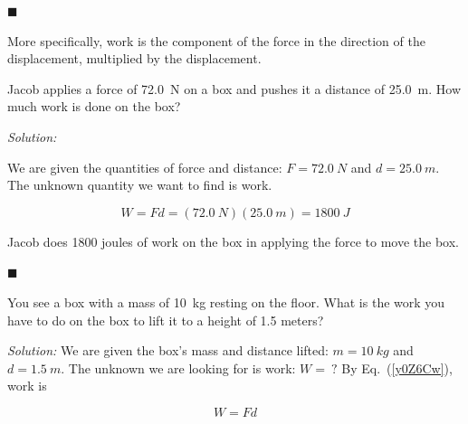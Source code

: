 \documentclass[dvipsnames]{article}
\begin{document}

\hfill $\blacksquare$

More specifically, work is the component of the force in the direction of the displacement, multiplied by the displacement.


\begin{example} \label{HKavsZ}
Jacob applies a force of \SI{72.0}{N} on a box and pushes it a distance of \SI{25.0}{m}. How much work is done on the box?
\end{example} 

\begin{center}
\end{center}

\textit{Solution:} 

We are given the quantities of force and distance: $F = \SI{72.0}{N}$ and $d = \SI{25.0}{m}$. The unknown quantity we want to find is work.

\begin{equation*}
    W = F d = \left(\SI{72.0}{N}\right)\left(\SI{25.0}{m}\right) = \SI{1800}{J}
\end{equation*}

Jacob does 1800 joules of work on the box in applying the force to move the box.

\hfill $\blacksquare$


\begin{example}\label{O9RxyJ}
You see a box with a mass of \SI{10}{kg} resting on the floor. What is the work you have to do on the box to lift it to a height of 1.5 meters? 
\end{example} 
 

\textit{Solution:} 
We are given the box's mass and distance lifted: $m = \SI{10}{kg}$ and $d = \SI{1.5}{m}$. The unknown we are looking for is work: $W =\ ?$ By Eq.~(\ref{y0Z6Cw}), work is

\begin{equation*}
    W = F d
\end{equation*}
\end{document}
